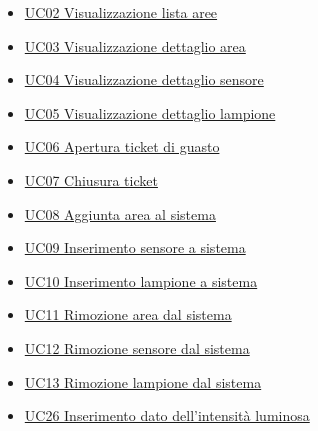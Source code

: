 \begin{itemize}
    \item \hyperref[uc:02]{UC02 Visualizzazione lista aree}
    \item \hyperref[uc:03]{UC03 Visualizzazione dettaglio area}
    \item \hyperref[uc:04]{UC04 Visualizzazione dettaglio sensore}
    \item \hyperref[uc:05]{UC05 Visualizzazione dettaglio lampione}
    \item \hyperref[uc:06]{UC06 Apertura ticket di guasto}
    \item \hyperref[uc:07]{UC07 Chiusura ticket}
    \item \hyperref[uc:08]{UC08 Aggiunta area al sistema}
    \item \hyperref[uc:09]{UC09 Inserimento sensore a sistema}
    \item \hyperref[uc:10]{UC10 Inserimento lampione a sistema}
    \item \hyperref[uc:11]{UC11 Rimozione area dal sistema}
    \item \hyperref[uc:12]{UC12 Rimozione sensore dal sistema}
    \item \hyperref[uc:13]{UC13 Rimozione lampione dal sistema}
    \item \hyperref[uc:26]{UC26 Inserimento dato dell'intensità luminosa}
\end{itemize}